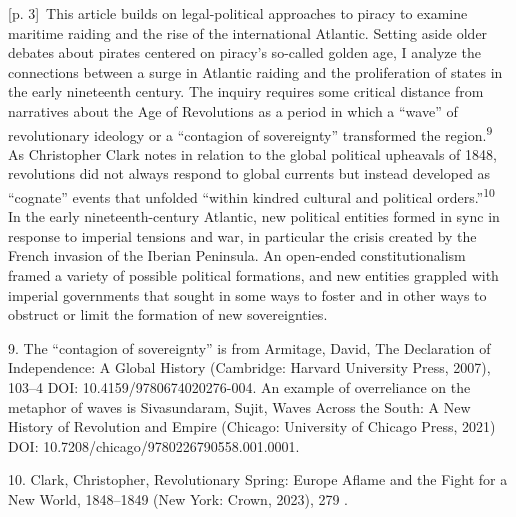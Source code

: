 \documentclass[10pt,a4paper]{article}
\begin{document}
{\scriptsize\color{gray} [p. 3]}\ This article builds on legal-political approaches to piracy to examine maritime raiding and the rise of the international Atlantic. Setting aside older debates about pirates centered on piracy’s so-called golden age, I analyze the connections between a surge in Atlantic raiding and the proliferation of states in the early nineteenth century. The inquiry requires some critical distance from narratives about the Age of Revolutions as a period in which a “wave” of revolutionary ideology or a “contagion of sovereignty” transformed the region.\nobreak\textsuperscript{9} As Christopher Clark notes in relation to the global political upheavals of 1848, revolutions did not always respond to global currents but instead developed as “cognate” events that unfolded “within kindred cultural and political orders.”\nobreak\textsuperscript{10} In the early nineteenth-century Atlantic, new political entities formed in sync in response to imperial tensions and war, in particular the crisis created by the French invasion of the Iberian Peninsula. An open-ended constitutionalism framed a variety of possible political formations, and new entities grappled with imperial governments that sought in some ways to foster and in other ways to obstruct or limit the formation of new sovereignties.\par{\small 9. The “contagion of sovereignty” is from Armitage, David, The Declaration of Independence: A Global History (Cambridge: Harvard University Press, 2007), 103–4 DOI: 10.4159/9780674020276-004. An example of overreliance on the metaphor of waves is Sivasundaram, Sujit, Waves Across the South: A New History of Revolution and Empire (Chicago: University of Chicago Press, 2021) DOI: 10.7208/chicago/9780226790558.001.0001.\par}{\small 10. Clark, Christopher, Revolutionary Spring: Europe Aflame and the Fight for a New World, 1848–1849 (New York: Crown, 2023), 279 .\par}
\end{document}
